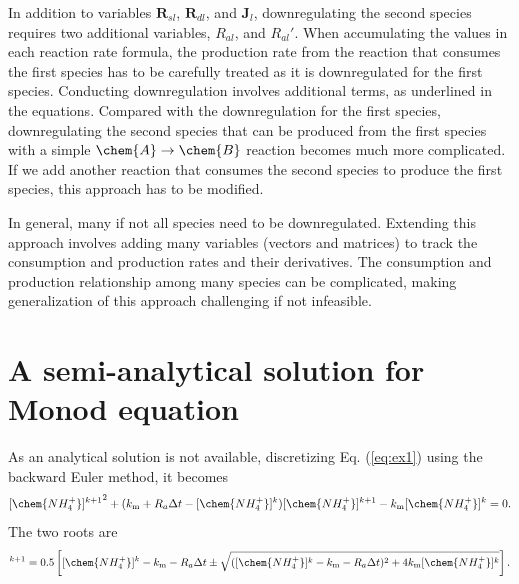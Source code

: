 \documentclass[gmd, manuscript]{copernicus}
\begin{document}
In addition to variables $\mathbf{R}_{sl}$, $\mathbf{R}_{dl}$, and $\mathbf{J}_l$,
downregulating the second species requires two additional variables,
$R_{al}$, and $R_{al}'$. When accumulating the values in each reaction rate
formula, the production rate from the reaction that consumes the first species
has to be carefully treated as it is downregulated for the first species.
Conducting downregulation involves additional terms, as underlined in the
equations. Compared with the downregulation for the first species,
downregulating the second species that can be produced from the first species
with a simple $\chem{A}\rightarrow\chem{B}$ reaction becomes much more
complicated. If we add another reaction that consumes the second species to
produce the first species, this approach has to be modified. 

In general, many if not all species need to be downregulated. Extending this
approach involves adding many variables (vectors and matrices) to track the
consumption and production rates and their derivatives. The consumption and
production relationship among many species can be complicated, making
generalization of this approach challenging if not infeasible. 

\section{A semi-analytical solution for Monod equation}
\label{sec:monodsemi}
As an analytical solution is not available, discretizing Eq. (\ref{eq:ex1})
using the backward Euler method, it becomes
\begin{equation}
{[\chem{NH_4^+}]^{k+1}}^2+(k_\text{m} + R_a \Delta t - [\chem{NH_4^+}]^k)
[\chem{NH_4^+}]^{k+1} - k_\text{m} [\chem{NH_4^+}]^k = 0.
\end{equation}
The two roots are
\begin{equation}
[\chem{NH_4^+}]^{k+1}=0.5 \left[[\chem{NH_4^+}]^k - k_\text{m} - R_a \Delta t
\pm \sqrt{([\chem{NH_4^+}]^k - k_\text{m} - R_a\Delta t)^2 + 4
k_\text{m}[\chem{NH_4^+}]^k}\right].
\label{eq:monodsemi}
\end{equation}
\end{document}
